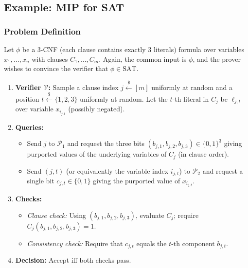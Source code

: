 \subsection*{Example: MIP for SAT}

\subsubsection*{Problem Definition}

Let $\phi$ be a 3-CNF (each clause contains exactly 3 literals) formula over variables $x_1,\dots,x_n$ with clauses $C_1,\dots,C_m$. Again, the common input is $\phi$, and the prover wishes to convince the verifier that $\phi \in \text{SAT}$.

\myspace

\begin{protocol}
\begin{enumerate}
  \item \textbf{Verifier $\mathcal{V}$:} Sample a clause index $j \xleftarrow{\$} [m]$ uniformly at random and a position $t \xleftarrow{\$} \{1,2,3\}$ uniformly at random. Let the $t$-th literal in $C_j$ be $\ell_{j,t}$ over variable $x_{i_{j,t}}$ (possibly negated).
  
  \item \textbf{Queries:}
  \begin{itemize}
    \item Send $j$ to $\mathcal{P}_1$ and request the three bits $(b_{j,1},b_{j,2},b_{j,3}) \in \{0,1\}^3$ giving purported values of the underlying variables of $C_j$ (in clause order).
    \item Send $(j,t)$ (or equivalently the variable index $i_{j,t}$) to $\mathcal{P}_2$ and request a single bit $c_{j,t}\in\{0,1\}$ giving the purported value of $x_{i_{j,t}}$.
  \end{itemize}
  
  \item \textbf{Checks:}
  \begin{itemize}
    \item \emph{Clause check:} Using $(b_{j,1},b_{j,2},b_{j,3})$, evaluate $C_j$; require $C_j(b_{j,1},b_{j,2},b_{j,3})=1$.
    \item \emph{Consistency check:} Require that $c_{j,t}$ equals the $t$-th component $b_{j,t}$.
  \end{itemize}
  
  \item \textbf{Decision:} Accept iff both checks pass.
\end{enumerate}
\end{protocol}

